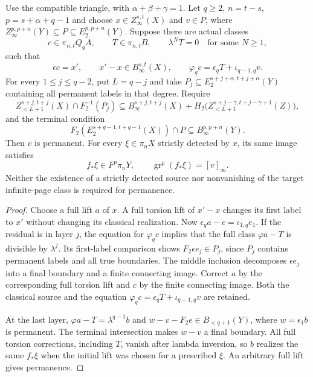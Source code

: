 \begin{corollary}
\label{sem:ProofTools:coverage-torsion-affine-permanent}
Use the compatible triangle, with $\alpha+\beta+\gamma=1$.
Let $q\ge2$, $n=t-s$, $p=s+\alpha+q-1$ and choose
$x\in Z_\infty^{s,t}(X)$ and
$v\in P$, where
$Z_\infty^{p,p+n}(Y)\subseteq P\subseteq E_2^{p,p+n}(Y)$.
Suppose there are actual classes
\[
 c\in\pi_{n,t}Q_qA,\qquad T\in\pi_{n,t}B,\qquad
 \lambda^NT=0\quad\text{for some }N\ge1,
\]
such that
\[
 \epsilon c=x',\qquad x'-x\in B_\infty^{s,t}(X),\qquad
 \varphi_qc=\epsilon_qT+\iota_{q-1,q}v.
\]
For every $1\le j\le q-2$, put $L=q-j$ and take
$P_j\subseteq E_2^{s+j+\alpha,t+j+\alpha}(Y)$ containing all
permanent labels in that degree. Require
\[
 Z_{<L+1}^{s+j,t+j}(X)\cap F_2^{-1}(P_j)
 \subseteq B_\infty^{s+j,t+j}(X)
 +H_2\bigl(Z_{<L+1}^{s+j-\gamma,t+j-\gamma+1}(Z)\bigr),
\]
and the terminal condition
\[
 F_2(E_2^{s+q-1,t+q-1}(X))\cap P
 \subseteq B_\infty^{p,p+n}(Y).
\]
Then $v$ is permanent. For every $\xi\in\pi_nX$ strictly detected
by $x$, its same image satisfies
\[
 f_*\xi\in F^p\pi_nY,\qquad
 \operatorname{gr}^{p}(f_*\xi)=[v]_\infty.
\]
Neither the existence of a strictly detected source nor nonvanishing
of the target infinite-page class is required for permanence.
\end{corollary}
\begin{proof}
Choose a full lift $a$ of $x$. A full torsion lift of $x'-x$ changes
its first label to $x'$ without changing its classical realization.
Now $\epsilon_qa-c=\iota_{1,q}e_1$.
If the residual is in layer $j$, the equation for $\varphi_qc$
implies that the full class $\varphi a-T$ is divisible by
$\lambda^j$. Its first-label comparison shows
$F_2\epsilon e_j\in P_j$, since $P_j$ contains permanent labels
and all true boundaries. The middle inclusion decomposes
$\epsilon e_j$ into a final boundary and a finite connecting image.
Correct $a$ by the corresponding full torsion lift and $c$ by the
finite connecting image. Both the classical source and the equation
$\varphi_qc=\epsilon_qT+\iota_{q-1,q}v$ are retained.

At the last layer,
$\varphi a-T=\lambda^{q-1}b$ and
$w-v-F_2e\in B_{<q+1}(Y)$, where $w=\epsilon_1b$ is permanent.
The terminal intersection makes $w-v$ a final boundary.
All full torsion corrections, including $T$, vanish after lambda
inversion, so $b$ realizes the same $f_*\xi$ when the initial lift
was chosen for a prescribed $\xi$. An arbitrary full lift gives permanence.
\end{proof}

